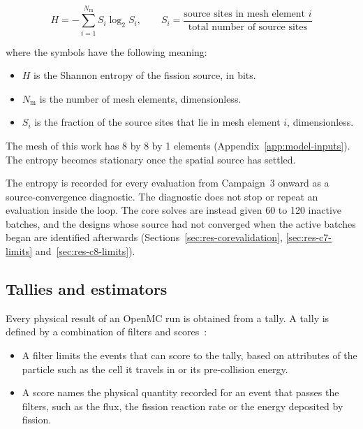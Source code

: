 \begin{equation}
H = -\sum_{i=1}^{N_\mathrm{m}} S_i \log_2 S_i,
\qquad
S_i = \frac{\text{source sites in mesh element } i}
           {\text{total number of source sites}}
\label{eq:shannon}
\end{equation}

\noindent where the symbols have the following meaning:

\begin{itemize}
  \item $H$ is the Shannon entropy of the fission source, in bits.

  \item $N_\mathrm{m}$ is the number of mesh elements, dimensionless.

  \item $S_i$ is the fraction of the source sites that lie in mesh
        element $i$, dimensionless.
\end{itemize}

The mesh of this work has 8 by 8 by 1 elements
(Appendix~\ref{app:model-inputs}). The entropy becomes stationary once
the spatial source has settled.

The entropy is recorded for every evaluation from Campaign~3 onward as a
source-convergence diagnostic. The diagnostic does not stop or repeat an
evaluation inside the loop. The core solves are instead given 60 to 120
inactive batches, and the designs whose source had not converged when
the active batches began are identified afterwards
(Sections~\ref{sec:res-corevalidation}, \ref{sec:res-c7-limits}
and~\ref{sec:res-c8-limits}).

\subsection{Tallies and estimators}
\label{sec:bg-mc-tally}

Every physical result of an OpenMC run is obtained from a tally. A tally
is defined by a combination of filters and
scores~\cite{romano_openmc_2015}:

\begin{itemize}
  \item A filter limits the events that can score to the tally, based on
        attributes of the particle such as the cell it travels in or its
        pre-collision energy.

  \item A score names the physical quantity recorded for an event that
        passes the filters, such as the flux, the fission reaction rate
        or the energy deposited by fission.
\end{itemize}

